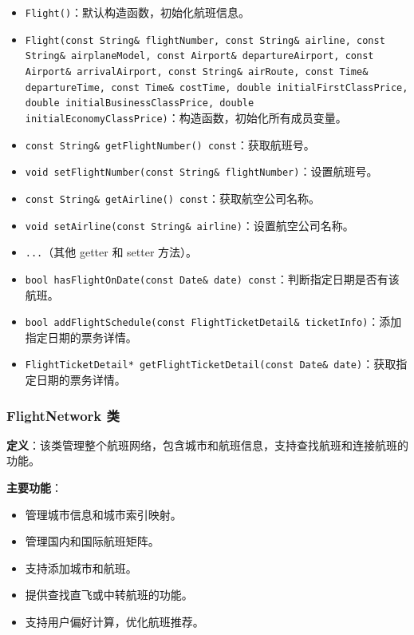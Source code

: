 \documentclass[UTF8, a4paper,12pt]{ctexart}
\begin{document}
\begin{itemize}
    \item \texttt{Flight()}：默认构造函数，初始化航班信息。
    \item \texttt{Flight(const String\& flightNumber, const String\& airline, const String\& airplaneModel, const Airport\& departureAirport, const Airport\& arrivalAirport, const String\& airRoute, const Time\& departureTime, const Time\& costTime, double initialFirstClassPrice, double initialBusinessClassPrice, double initialEconomyClassPrice)}：构造函数，初始化所有成员变量。
    \item \texttt{const String\& getFlightNumber() const}：获取航班号。
    \item \texttt{void setFlightNumber(const String\& flightNumber)}：设置航班号。
    \item \texttt{const String\& getAirline() const}：获取航空公司名称。
    \item \texttt{void setAirline(const String\& airline)}：设置航空公司名称。
    \item \texttt{...}（其他 getter 和 setter 方法）。
    \item \texttt{bool hasFlightOnDate(const Date\& date) const}：判断指定日期是否有该航班。
    \item \texttt{bool addFlightSchedule(const FlightTicketDetail\& ticketInfo)}：添加指定日期的票务详情。
    \item \texttt{FlightTicketDetail* getFlightTicketDetail(const Date\& date)}：获取指定日期的票务详情。
\end{itemize}

\subsubsection{FlightNetwork 类}

\textbf{定义}：该类管理整个航班网络，包含城市和航班信息，支持查找航班和连接航班的功能。

\textbf{主要功能}：

\begin{itemize}
    \item 管理城市信息和城市索引映射。
    \item 管理国内和国际航班矩阵。
    \item 支持添加城市和航班。
    \item 提供查找直飞或中转航班的功能。
    \item 支持用户偏好计算，优化航班推荐。
\end{itemize}
\end{document}
